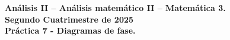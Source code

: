 \documentclass[11pt,a4paper,pdftex]{amsart}
\renewcommand{\bf}{\textbf}
\newcommand{\0}{\mathbb O}
\newcommand{\8}{\infty}
\begin{document}

\begin{center}
\bf{\Large An\'alisis II -- An\'alisis matem\'atico II -- Matem\'atica 3.} \\
\bigskip
\bf{\large Segundo Cuatrimestre de 2025}\\
\bigskip
\bf{Pr\'actica 7 - Diagramas de fase.}
\end{center}

\bigskip\bigskip

\setcounter{equation}{0}


%
\end{document}
